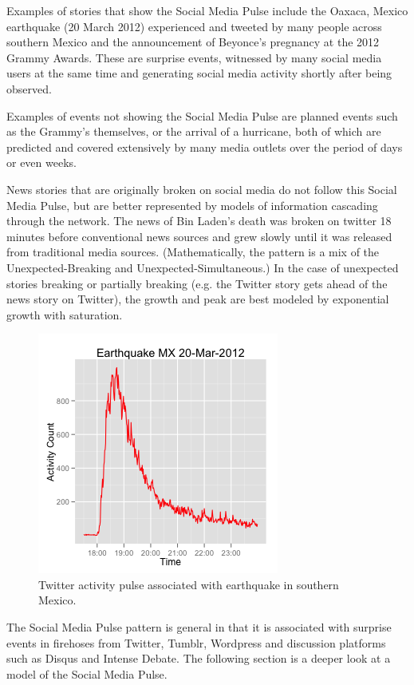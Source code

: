 \documentclass{article}
\begin{document}
Examples of stories that show the Social Media Pulse include the Oaxaca, Mexico earthquake (20 March 2012) experienced and tweeted by many people across southern Mexico and the announcement of Beyonce's pregnancy at the 2012 Grammy Awards. These are surprise events, witnessed by many social media users at the same time and generating social media activity shortly after being observed.

Examples of events not showing the Social Media Pulse are planned events such as the Grammy's themselves, or the arrival of a hurricane, both of which are predicted and covered extensively by many media outlets over the period of days or even weeks. 

News stories that are originally broken on social media do not follow this Social Media Pulse, but are better represented by models of information cascading through the network. The news of Bin Laden's death was broken on twitter 18 minutes before conventional news sources and grew slowly until it was released from traditional media sources. (Mathematically, the pattern is a mix of the Unexpected-Breaking and Unexpected-Simultaneous.)  In the case of unexpected stories breaking or partially breaking (e.g. the Twitter story gets ahead of the news story on Twitter), the growth and peak are best modeled by exponential growth with saturation.

\begin{figure}[ht]
\includegraphics[width=2.8 in]{img/twitterPulse_limit.png}
\caption{Twitter activity pulse associated with earthquake in southern Mexico.}
\label{fig:TwitterLimited}
\end{figure}

The Social Media Pulse pattern is general in that it is associated with surprise events in firehoses from Twitter, Tumblr, Wordpress and discussion platforms such as Disqus and Intense Debate.  The following section is a deeper look at a model of the Social Media Pulse.
\end{document}
